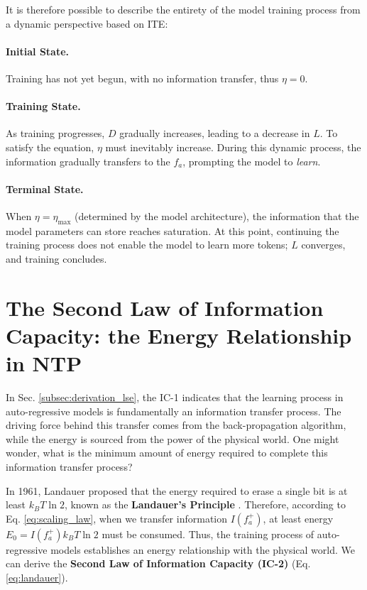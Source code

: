 \documentclass{article}
\theoremstyle{plain}
\theoremstyle{definition}
\theoremstyle{remark}
\begin{document}
It is therefore possible to describe the entirety of the model training process from a dynamic perspective based on ITE:

\paragraph{Initial State.} Training has not yet begun, with no information transfer, thus $\eta=0$. 

\paragraph{Training State.} As training progresses, $D$ gradually increases, leading to a decrease in $L$. To satisfy the equation, $\eta$ must inevitably increase. During this dynamic process, the information gradually transfers to the $f_a$, prompting the model to \textit{learn}.

\paragraph{Terminal State.} When $\eta=\eta_{\text{max}}$ (determined by the model architecture), the information that the model parameters can store reaches saturation. At this point, continuing the training process does not enable the model to learn more tokens; $L$ converges, and training concludes.


\section{The Second Law of Information Capacity: the Energy Relationship in NTP}\label{sec:law_of_ce}

In Sec. \ref{subsec:derivation_lse}, the IC-1 indicates that the learning process in auto-regressive models is fundamentally an information transfer process. The driving force behind this transfer comes from the back-propagation \cite{BP_1986} algorithm, while the energy is sourced from the power of the physical world. One might wonder, what is the minimum amount of energy required to complete this information transfer process?

In 1961, Landauer proposed that the energy required to erase a single bit is at least 
$k_B T \ln 2$, known as the \textbf{Landauer's Principle} \cite{5392446}. Therefore, according to Eq. \ref{eq:scaling_law}, when we transfer information $I(f_a^{+})$, at least energy $E_0=I(f_a^{+}) k_B T \ln 2$ must be consumed. Thus, the training process of auto-regressive models establishes an energy relationship with the physical world. We can derive the \textbf{Second Law of Information Capacity (IC-2)} (Eq. \ref{eq:landauer}).
\end{document}
